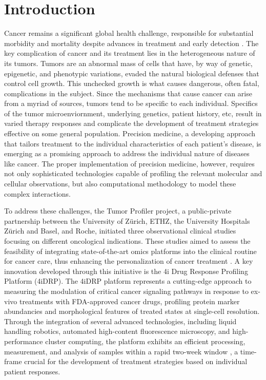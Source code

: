 \section{Introduction}
Cancer remains a significant global health challenge, responsible for substantial morbidity and mortality despite advances in treatment and early detection \cite{need}.
The key complication of cancer and its treatment lies in the heterogeneous nature of its tumors.
Tumors are an abnormal mass of cells that have, by way of genetic, epigenetic, and phenotypic variations, evaded the natural biological defenses that control cell growth.
This unchecked growth is what causes dangerous, often fatal, complications in the subject.
Since the mechanisms that cause cancer can arise from a myriad of sources, tumors tend to be specific to each individual.
Specifics of the tumor microenviornment, underlying genetics, patient history, etc,
result in varied therapy responses and complicate the development of treatment strategies effective on some general population.
Precision medicine, a developing approach that tailors treatment to the individual characteristics of each patient's disease,
is emerging as a promising approach to address the individual nature of diseases like cancer.
The proper implementation of precision medicine, however, requires not only sophisticated technologies capable of profiling the relevant molecular and cellular observations,
but also computational methodology to model these complex interactions.

To address these challenges, the Tumor Profiler project, a public-private partnership between the University of Zürich, ETHZ, the University Hospitals Zürich and Basel, and Roche, initiated three observational clinical studies focusing on different oncological indications.
These studies aimed to assess the feasibility of integrating state-of-the-art omics platforms into the clinical routine for cancer care, thus enhancing the personalization of cancer treatment \cite{need}.
A key innovation developed through this initiative is the 4i Drug Response Profiling Platform (4iDRP).
The 4iDRP platform represents a cutting-edge approach to measuring the modulation of critical cancer signaling pathways in response to ex-vivo treatments with FDA-approved cancer drugs,
profiling protein marker abundancies and morphological features of treated states at single-cell resolution.
Through the integration of several advanced technologies, including liquid handling robotics, automated high-content fluorescence microscopy, and high-performance cluster computing,
the platform exhibits an efficient processing, measurement, and analysis of samples within a rapid two-week window \cite{need},
a time-frame crucial for the development of treatment strategies based on individual patient responses.

